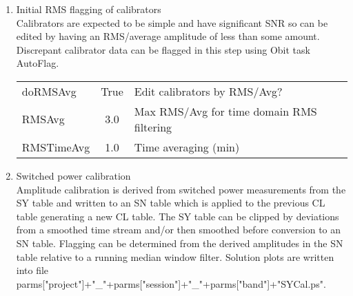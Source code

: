 \documentclass[11pt]{article}
\begin{document}
\begin{enumerate}
\begin{center}
\end{center}
%
\item Initial RMS flagging of calibrators \\
Calibrators are expected to be simple and have  significant SNR so can
be edited by having an RMS/average amplitude of less than some
amount.
Discrepant calibrator data can be flagged in this step using Obit task
AutoFlag.
\begin{center}
\begin{tabular}{|l|c|l|}
\hline
doRMSAvg   & True &  Edit calibrators by RMS/Avg?\\
RMSAvg     & 3.0  &  Max RMS/Avg for time domain RMS filtering\\
RMSTimeAvg & 1.0  &  Time averaging (min)\\
\hline
\end{tabular}
\end{center}
%
\item Switched power calibration\\
Amplitude calibration is derived from switched power measurements from
the SY table and written to an SN table which is applied to the
previous CL table generating a new CL table.
The SY table can be clipped by deviations from a smoothed time stream
and/or then smoothed before conversion to an SN table.
Flagging can be determined from the derived amplitudes in the SN table
relative to a running median window filter.
Solution plots are written into file\\
parms["project"]+"\_"+parms["session"]+"\_"+parms["band"]+"SYCal.ps".


\end{enumerate}
\end{document}
